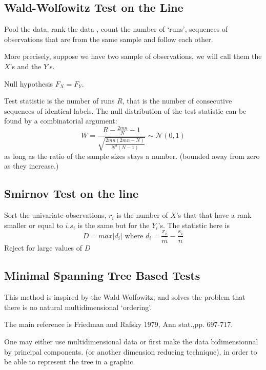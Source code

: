 \documentclass{article}
\begin{document}
\subsection*{Wald-Wolfowitz Test on the Line}
Pool the data, rank the data , count the number of
`runs', sequences of  observations
that are from the same sample and follow each other.

More precisely, suppose we have two sample of observations,
we will call them the $X$'s and the $Y$'s.

Null hypothesis $F_X=F_Y$.

Test statistic is the number of runs $R$, that is the
number of consecutive sequences of identical labels.
The null distribution of the test statistic
can be found by a combinatorial argument:
$$W=\frac{R-\frac{2mn}{N}-1}{\sqrt{\frac{2mn(2mn-N)}{N^2(N-1)}}} \sim {\mathcal N}(0,1)$$
as long as the ratio of the sample sizes stays a number.
(bounded away from zero as they increase.)
\subsection*{Smirnov Test on the line}
Sort the univariate observations, $r_i$ is the number of
$X$'s that that have a rank smaller or equal
to $i$.$s_i$ is the same but for the $Y_i$'s.
The statistic here is $$D=max|d_i|\mbox{ where }d_i=
\frac{r_i}{m}-\frac{s_i}{n}
$$
Reject for large values of $D$
\subsection*{Minimal Spanning Tree Based Tests}
This method is inspired by the Wald-Wolfowitz, and
solves the problem that there is no
natural multidimensional `ordering'.

The main reference is 
Friedman and Rafsky 1979, Ann stat.,pp.  697-717.

One may either use multidimensional data
or
first make the data bidimensionnal by principal components.
(or another dimension reducing technique),
in order to be able to represent the tree
in a graphic.
\end{document}
